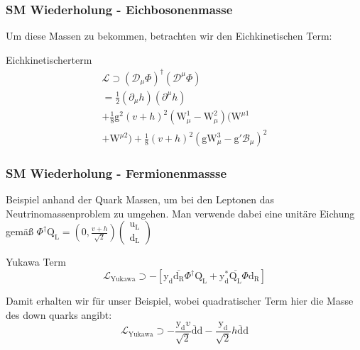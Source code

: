 \documentclass{beamer}
\begin{document}
\begin{frame}
\frametitle{SM Wiederholung - Eichbosonenmasse}
Um diese Massen zu bekommen, betrachten wir den Eichkinetischen Term: 
\begin{block}{Eichkinetischerterm}
\begin{equation}
\begin{split}
\mathscr{L}\supset (\mathscr{D}_{\mu}\Phi)^{\dagger}(\mathscr{D}^{\mu}\Phi) \\ = \frac{1}{2} (\partial_{\mu} h)(\partial^{\mu}h)\\+\frac{1}{8} \text{g}^{2}(v+h)^{2} (\text{W}_{\mu}^{1}-\text{W}_{\mu}^{2})(\text{W}^{\mu1}\\+\text{W}^{\mu2})+\frac{1}{8}(v+h)^{2}(\text{g}\text{W}^{3}_{\mu}-\text{g}\prime \mathscr{B}_{\mu})^{2}
\end{split}
\end{equation}
\end{block}




\end{frame}
\begin{frame}
\frametitle{SM Wiederholung - Fermionenmassse}
Beispiel anhand der Quark Massen, um bei den Leptonen das Neutrinomassenproblem zu umgehen. Man verwende dabei eine unitäre Eichung gemäß $\Phi^{\dagger}\text{Q}_{\text{L}}=\left(  0, \frac{v+h}{\sqrt{2}} \right)\left( \begin{array}{c} \text{u}_{\text{L}}\\ \text{d}_{\text{L}} \end{array}\right) $
\begin{block}{Yukawa Term}
\begin{equation}
\mathscr{L}_{\text{Yukawa}}\supset -[\text{y}_{\text{d}}\overline{\text{d}_{\text{R}}} \Phi^{\dagger}\text{Q}_{\text{L}}+\text{y}_{\text{d}}^{*} \overline{\text{Q}_{\text{L}}}\Phi \text{d}_{\text{R}}]
\end{equation}
\end{block}
Damit erhalten wir für unser Beispiel, wobei quadratischer Term hier die Masse des down quarks angibt: 
\begin{equation}
\mathscr{L}_{\text{Yukawa}}\supset -\frac{\text{y}_{\text{d}}v}{\sqrt{2}}\overline{\text{d}} \text{d} - \frac{\text{y}_{\text{d}}}{\sqrt{2}}h\overline{\text{d}} \text{d} 
\end{equation}
\end{frame}
\end{document}
